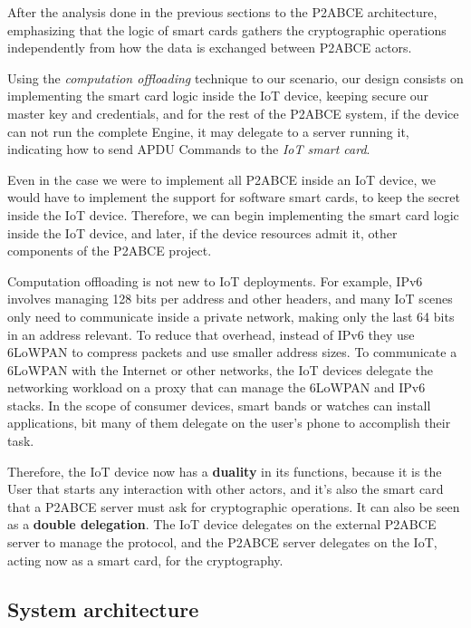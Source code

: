 After the analysis done in the previous sections to the P2ABCE architecture, emphasizing that the logic of smart cards gathers the cryptographic operations independently from how the data is exchanged between P2ABCE actors. 

Using the \textit{computation offloading} technique to our scenario, our design consists on implementing the smart card logic inside the IoT device, keeping secure our master key and credentials, and for the rest of the P2ABCE system, if the device can not run the complete Engine, it may delegate to a server running it, indicating how to send APDU Commands to the \textit{IoT smart card}.

Even in the case we were to implement all P2ABCE inside an IoT device, we would have to implement the support for software smart cards, to keep the secret inside the IoT device. Therefore, we can begin implementing the smart card logic inside the IoT device, and later, if the device resources admit it, other components of the P2ABCE project.


\hfil

Computation offloading is not new to IoT deployments. For example, IPv6 involves managing 128 bits per address and other headers, and many IoT scenes only need to communicate inside a private network, making only the last 64 bits in an address relevant. To reduce that overhead, instead of IPv6 they use 6LoWPAN to compress packets and use smaller address sizes. To communicate a 6LoWPAN with the Internet or other networks, the IoT devices delegate the networking workload on a proxy that can manage the 6LoWPAN and IPv6 stacks. In the scope of consumer devices, smart bands or watches can install applications, bit many of them delegate on the user's phone to accomplish their task.

Therefore, the IoT device now has a \textbf{duality} in its functions, because it is the User that starts any interaction with other actors, and it's also the smart card that a P2ABCE server must ask for cryptographic operations. It can also be seen as a \textbf{double delegation}. The IoT device delegates on the external P2ABCE server to manage the protocol, and the P2ABCE server delegates on the IoT, acting now as a smart card, for the cryptography.

\subsection{System architecture}




